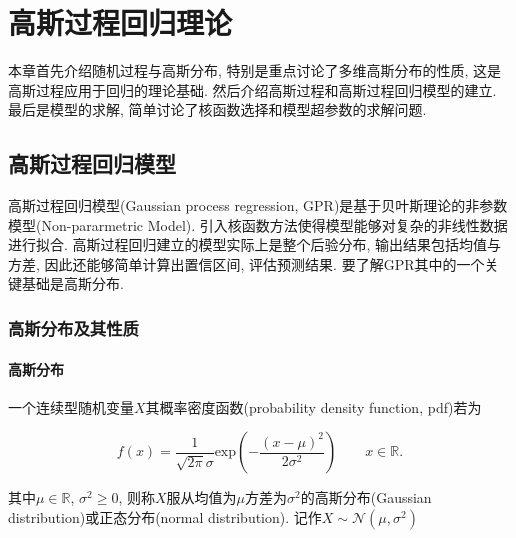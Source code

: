 \newpage
\section{高斯过程回归理论}

    本章首先介绍随机过程与高斯分布, 特别是重点讨论了多维高斯分布的性质, 这是高斯过程应用于回归的理论基础. 然后介绍高斯过程和高斯过程回归模型的建立. 最后是模型的求解, 简单讨论了核函数选择和模型超参数的求解问题.

    \subsection{高斯过程回归模型}

        高斯过程回归模型(Gaussian process regression, GPR)是基于贝叶斯理论的非参数模型(Non-pararmetric Model). 引入核函数方法使得模型能够对复杂的非线性数据进行拟合. 高斯过程回归建立的模型实际上是整个后验分布, 输出结果包括均值与方差, 因此还能够简单计算出置信区间, 评估预测结果. 要了解GPR其中的一个关键基础是高斯分布.


        \subsubsection{高斯分布及其性质}

            \paragraph{高斯分布}

                \begin{definition}[高斯分布]
                    一个连续型随机变量$X$其概率密度函数(probability density function, pdf)若为
                    
                    \begin{equation}
                        f(x)=\frac{1}{\sqrt{2\pi}\sigma}\mathrm{exp}\left(-\frac{(x-\mu)^2}{2\sigma^{2}}\right)\qquad x\in \mathds{R}. \label{2.1}
                    \end{equation}

                    其中$\mu\in\mathds{R}$, $\sigma^{2}\geqslant 0$, 则称$X$服从均值为$\mu$方差为$\sigma^{2}$的高斯分布(Gaussian distribution)或正态分布(normal distribution). 记作$X\sim\mathcal{N}(\mu, \sigma^{2})$
                \end{definition}

